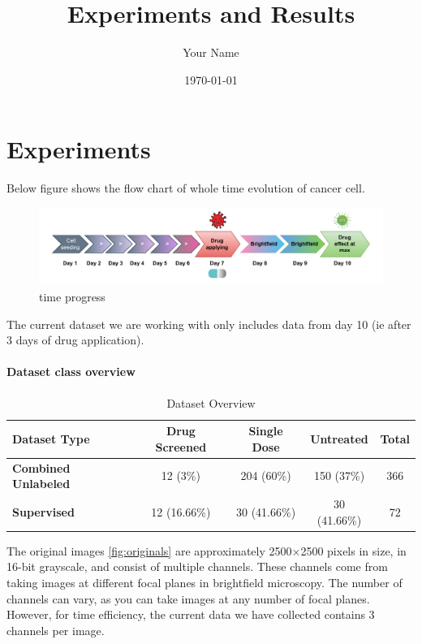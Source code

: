 \documentclass[a4paper,12pt]{report}
\title{Experiments and Results}
\author{Your Name}
\date{\today}
\begin{document}
\maketitle

\chapter{Experiments}\label{ch:Experiments}

Below figure shows the flow chart of whole time evolution of cancer cell.

\begin{figure}[H]
  \centering
  \includegraphics[scale=0.9]{figures/time.pdf} 
  \caption{time progress}
  \label{fig:time}
\end{figure}

The current dataset we are working with only includes data from day 10 (ie after 3 days of drug application). 

\vspace{1em} %

\subsubsection{Dataset class overview}
\begin{table}[ht!]
  \centering
  \begin{tabular}{|l|c|c|c|c|}
  \hline
  \textbf{Dataset Type} & \textbf{Drug Screened} & \textbf{Single Dose} & \textbf{Untreated} & \textbf{Total} \\ \hline
  \textbf{Combined Unlabeled} & 12 (3\%) & 204 (60\%) & 150 (37\%) & 366 \\ \hline
  \textbf{Supervised}         & 12 (16.66\%) & 30 (41.66\%)  & 30 (41.66\%) & 72  \\ \hline
  \end{tabular}
  \caption{Dataset Overview}
  \label{tab:dataset}
  \end{table}

The original images \ref{fig:originals} are approximately 2500×2500 pixels in size, in 16-bit grayscale, and consist of multiple channels. These channels come from taking images at different focal planes in brightfield microscopy. The number of channels can vary, as you can take images at any number of focal planes. However, for time efficiency, the current data we have collected contains 3 channels per image.
\end{document}
